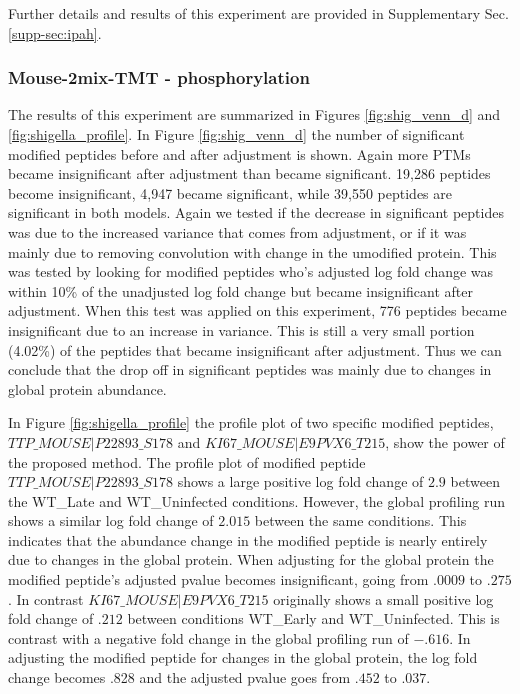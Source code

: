 \documentclass[mcp]{article}
\numberwithin{figure}{section} %
\numberwithin{table}{section}
\begin{document}
Further details and results of this experiment are provided in Supplementary Sec. \ref{supp-sec:ipah}. 

\subsubsection*{Mouse-2mix-TMT - phosphorylation}

The results of this experiment are summarized in Figures \ref{fig:shig_venn_d} and \ref{fig:shigella_profile}. In Figure \ref{fig:shig_venn_d} the number of significant modified peptides before and after adjustment is shown. Again more PTMs became insignificant after adjustment than became significant. 19,286 peptides become insignificant, 4,947 became significant, while 39,550 peptides are significant in both models. Again we tested if the decrease in significant peptides was due to the increased variance that comes from adjustment, or if it was mainly due to removing convolution with change in the umodified protein. This was tested by looking for modified peptides who's adjusted log fold change was within 10\% of the unadjusted log fold change but became insignificant after adjustment. When this test was applied on this experiment, 776 peptides became insignificant due to an increase in variance. This is still a very small portion (4.02\%) of the peptides that became insignificant after adjustment. Thus we can conclude that the drop off in significant peptides was mainly due to changes in global protein abundance.

In Figure \ref{fig:shigella_profile} the profile plot of two specific modified peptides, $TTP\_MOUSE|P22893\_S178$ and $KI67\_MOUSE|E9PVX6\_T215$, show the power of the proposed method.  The profile plot of modified peptide $TTP\_MOUSE|P22893\_S178$ shows a large positive log fold change of $2.9$ between the WT\_Late and WT\_Uninfected conditions. However, the global profiling run shows a similar log fold change of $2.015$ between the same conditions. This indicates that the abundance change in the modified peptide is nearly entirely due to changes in the global protein. When adjusting for the global protein the modified peptide's adjusted pvalue becomes insignificant, going from $.0009$ to $.275$. In contrast $KI67\_MOUSE|E9PVX6\_T215$ originally shows a small positive log fold change of $.212$ between conditions WT\_Early and WT\_Uninfected. This is contrast with a negative fold change in the global profiling run of $-.616$. In adjusting the modified peptide for changes in the global protein, the log fold change becomes .828 and the adjusted pvalue goes from $.452$ to $.037$.
\end{document}
